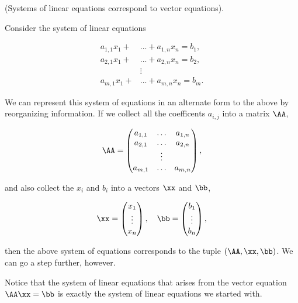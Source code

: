 \begin{deriv}
    (Systems of linear equations correspond to vector equations).
    
    Consider the system of linear equations
    
    \begin{align*}
        a_{1,1} x_1 + &... + a_{1,n} x_n = b_1, \\
        a_{2,1} x_1 + &... + a_{2,n} x_n = b_2, \\
        &\vdots \\
        a_{m,1} x_1 + &... + a_{m,n} x_n = b_m.
    \end{align*}
    
    We can represent this system of equations in an alternate form to the above by reorganizing information. If we collect all the coefficents $a_{i,j}$ into a matrix $\AA$,
    
    \begin{align*}
        \AA
        =
        \begin{pmatrix}
            a_{1, 1} & \hdots & a_{1, n} \\
            a_{2, 1} & \hdots & a_{2, n} \\
            & \vdots & \\
            a_{m, 1} & \hdots & a_{m, n} \\
        \end{pmatrix},
    \end{align*}
    
    and also collect the $x_i$ and $b_i$ into a vectors $\xx$ and $\bb$,   
    
    \begin{align*}
        \xx
        =
        \begin{pmatrix}
            x_1 \\ \vdots \\ x_n
        \end{pmatrix}, \quad
        \bb
        =
        \begin{pmatrix}
            b_1 \\ \vdots \\ b_n
        \end{pmatrix},
    \end{align*}
    
    then the above system of equations corresponds to the tuple $(\AA, \xx, \bb)$. We can go a step further, however.
    
    Notice that the system of linear equations that arises from the vector equation $\AA \xx = \bb$ is exactly the system of linear equations we started with. 
    

\end{deriv}
